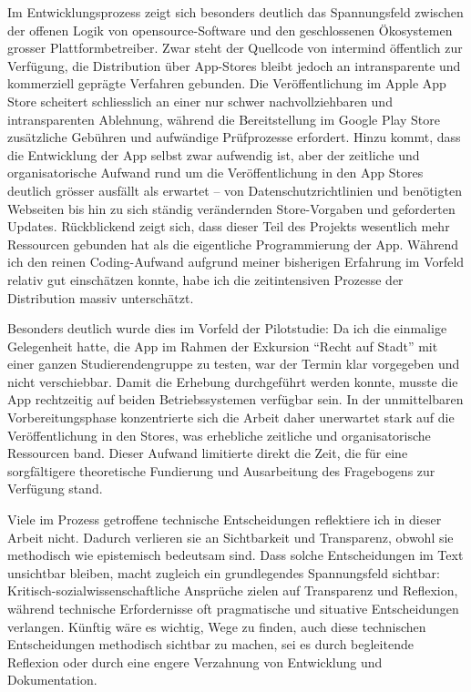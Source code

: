 \vspace{1em}

Im Entwicklungsprozess zeigt sich besonders deutlich das Spannungsfeld zwischen der offenen Logik von \gls{opensource}-Software und den geschlossenen Ökosystemen grosser Plattformbetreiber. Zwar steht der Quellcode von \gls{intermind} öffentlich zur Verfügung, die Distribution über App-Stores bleibt jedoch an intransparente und kommerziell geprägte Verfahren gebunden. Die Veröffentlichung im Apple App Store scheitert schliesslich an einer nur schwer nachvollziehbaren und intransparenten Ablehnung, während die Bereitstellung im Google Play Store zusätzliche Gebühren und aufwändige Prüfprozesse erfordert. Hinzu kommt, dass die Entwicklung der App selbst zwar aufwendig ist, aber der zeitliche und organisatorische Aufwand rund um die Veröffentlichung in den App Stores deutlich grösser ausfällt als erwartet -- von Datenschutzrichtlinien und benötigten Webseiten bis hin zu sich ständig verändernden Store-Vorgaben und geforderten Updates. Rückblickend zeigt sich, dass dieser Teil des Projekts wesentlich mehr Ressourcen gebunden hat als die eigentliche Programmierung der App. Während ich den reinen Coding-Aufwand aufgrund meiner bisherigen Erfahrung im Vorfeld relativ gut einschätzen konnte, habe ich die zeitintensiven Prozesse der Distribution massiv unterschätzt.

Besonders deutlich wurde dies im Vorfeld der Pilotstudie: Da ich die einmalige Gelegenheit hatte, die App im Rahmen der Exkursion \enquote{Recht auf Stadt} mit einer ganzen Studierendengruppe zu testen, war der Termin klar vorgegeben und nicht verschiebbar. Damit die Erhebung durchgeführt werden konnte, musste die App rechtzeitig auf beiden Betriebssystemen verfügbar sein. In der unmittelbaren Vorbereitungsphase konzentrierte sich die Arbeit daher unerwartet stark auf die Veröffentlichung in den Stores, was erhebliche zeitliche und organisatorische Ressourcen band. Dieser Aufwand limitierte direkt die Zeit, die für eine sorgfältigere theoretische Fundierung und Ausarbeitung des Fragebogens zur Verfügung stand.

Viele im Prozess getroffene technische Entscheidungen reflektiere ich in dieser Arbeit nicht. Dadurch verlieren sie an Sichtbarkeit und Transparenz, obwohl sie methodisch wie epistemisch bedeutsam sind. Dass solche Entscheidungen im Text unsichtbar bleiben, macht zugleich ein grundlegendes Spannungsfeld sichtbar: Kritisch-sozialwissenschaftliche Ansprüche zielen auf Transparenz und Reflexion, während technische Erfordernisse oft pragmatische und situative Entscheidungen verlangen. Künftig wäre es wichtig, Wege zu finden, auch diese technischen Entscheidungen methodisch sichtbar zu machen, sei es durch begleitende Reflexion oder durch eine engere Verzahnung von Entwicklung und Dokumentation.


